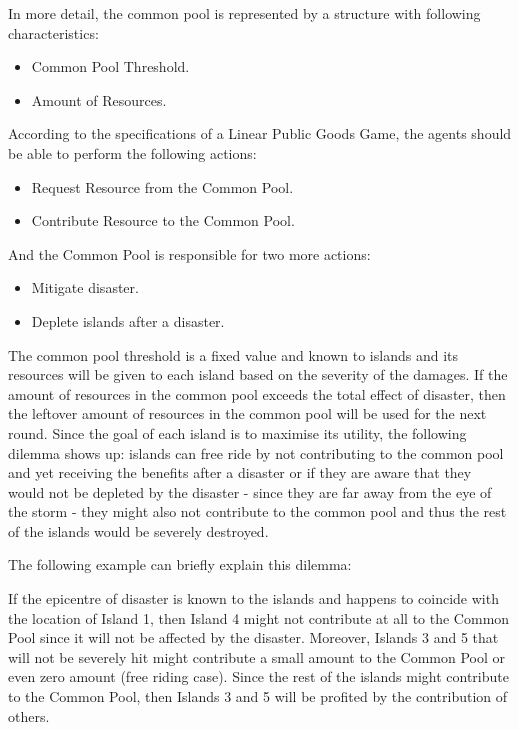 In more detail, the common pool is represented by a structure with following characteristics:

\begin{itemize}
    \item Common Pool Threshold.
    \item Amount of Resources.
\end{itemize}

According to the specifications of a Linear Public Goods Game, the agents should be able to perform the following actions:  

\begin{itemize}
    \item Request Resource from the Common Pool.
    \item Contribute Resource to the Common Pool. 
\end{itemize}

And the Common Pool is responsible for two more actions: 

\begin{itemize}
    \item Mitigate disaster.
    \item Deplete islands after a disaster.
\end{itemize}

The common pool threshold is a fixed value and known to islands and its resources will be given to each island based on the severity of the damages. If the amount of resources in the common pool exceeds the total effect of disaster, then the leftover amount of resources in the common pool will be used for the next round. Since the goal of each island is to maximise its utility, the following dilemma shows up: islands can free ride by not contributing to the common pool and yet receiving the benefits after a disaster or if they are aware that they would not be depleted by the disaster - since they are far away from the eye of the storm - they might also not contribute to the common pool and thus the rest of the islands would be severely destroyed.

The following example can briefly explain this dilemma:

If the epicentre of disaster is known to the islands and happens to coincide with the location of Island 1, then Island 4 might not contribute at all to the Common Pool since it will not be affected by the disaster. Moreover, Islands 3 and 5 that will not be severely hit might contribute a small amount to the Common Pool or even zero amount (free riding case). Since the rest of the islands might contribute to the Common Pool, then Islands 3 and 5 will be profited by the contribution of others.


